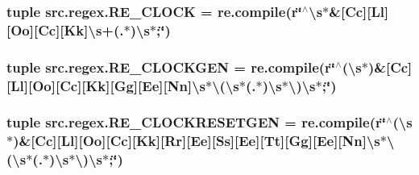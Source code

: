 \hypertarget{namespacesrc_1_1regex_aa281591aa1a33b595f2e65919536dbb8}{
\subsubsection[{R\-E\-\_\-\-C\-L\-O\-C\-K}]{\setlength{\rightskip}{0pt plus 5cm}tuple src.\-regex.\-R\-E\-\_\-\-C\-L\-O\-C\-K = re.\-compile(r\char`\"{}$^\wedge$\textbackslash{}s$\ast$\&\mbox{[}Cc\mbox{]}\mbox{[}Ll\mbox{]}\mbox{[}Oo\mbox{]}\mbox{[}Cc\mbox{]}\mbox{[}Kk\mbox{]}\textbackslash{}s+(.$\ast$)\textbackslash{}s$\ast$;\char`\"{})}}\label{namespacesrc_1_1regex_aa281591aa1a33b595f2e65919536dbb8}
\hypertarget{namespacesrc_1_1regex_a6d0912e01b5f6c03ac3abe469d563fa9}{
\subsubsection[{R\-E\-\_\-\-C\-L\-O\-C\-K\-G\-E\-N}]{\setlength{\rightskip}{0pt plus 5cm}tuple src.\-regex.\-R\-E\-\_\-\-C\-L\-O\-C\-K\-G\-E\-N = re.\-compile(r\char`\"{}$^\wedge$(\textbackslash{}s$\ast$)\&\mbox{[}Cc\mbox{]}\mbox{[}Ll\mbox{]}\mbox{[}Oo\mbox{]}\mbox{[}Cc\mbox{]}\mbox{[}Kk\mbox{]}\mbox{[}Gg\mbox{]}\mbox{[}Ee\mbox{]}\mbox{[}Nn\mbox{]}\textbackslash{}s$\ast$\textbackslash{}(\textbackslash{}s$\ast$(.$\ast$)\textbackslash{}s$\ast$\textbackslash{})\textbackslash{}s$\ast$;\char`\"{})}}\label{namespacesrc_1_1regex_a6d0912e01b5f6c03ac3abe469d563fa9}
\hypertarget{namespacesrc_1_1regex_a9c409ca249888eb67d8296ec5c7e5ba0}{
\subsubsection[{R\-E\-\_\-\-C\-L\-O\-C\-K\-R\-E\-S\-E\-T\-G\-E\-N}]{\setlength{\rightskip}{0pt plus 5cm}tuple src.\-regex.\-R\-E\-\_\-\-C\-L\-O\-C\-K\-R\-E\-S\-E\-T\-G\-E\-N = re.\-compile(r\char`\"{}$^\wedge$(\textbackslash{}s$\ast$)\&\mbox{[}Cc\mbox{]}\mbox{[}Ll\mbox{]}\mbox{[}Oo\mbox{]}\mbox{[}Cc\mbox{]}\mbox{[}Kk\mbox{]}\mbox{[}Rr\mbox{]}\mbox{[}Ee\mbox{]}\mbox{[}Ss\mbox{]}\mbox{[}Ee\mbox{]}\mbox{[}Tt\mbox{]}\mbox{[}Gg\mbox{]}\mbox{[}Ee\mbox{]}\mbox{[}Nn\mbox{]}\textbackslash{}s$\ast$\textbackslash{}(\textbackslash{}s$\ast$(.$\ast$)\textbackslash{}s$\ast$\textbackslash{})\textbackslash{}s$\ast$;\char`\"{})}}\label{namespacesrc_1_1regex_a9c409ca249888eb67d8296ec5c7e5ba0}
